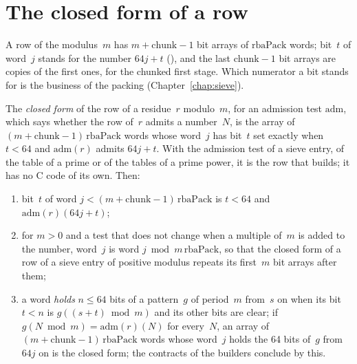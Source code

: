 \section{The closed form of a row}\label{sec:closedRow}

A row of the modulus~$m$ has $m + \mathrm{chunk} - 1$ bit arrays of $\mathrm{rbaPack}$ words;
bit~$t$ of word~$j$ stands for the number $64 j + t$ (), and the last
$\mathrm{chunk} - 1$ bit arrays are copies of the first ones, for the chunked first stage. Which
numerator a bit stands for is the business of the packing (Chapter~\ref{chap:sieve}).

\begin{lemma}\label{lem:closedRow}
  \leanok
  The \emph{closed form} of the row of a residue~$r$ modulo~$m$, for an admission test
  $\mathrm{adm}$, which says whether the row of~$r$ admits a number~$N$, is the array of
  $(m + \mathrm{chunk} - 1)\,\mathrm{rbaPack}$ words whose word~$j$ has bit~$t$ set exactly when
  $t < 64$ and $\mathrm{adm}(r)$ admits $64 j + t$. With the admission test of a sieve entry, of
  the table of a prime or of the tables of a prime power, it is the row that \ratpoints{} builds; it
  has no C code of its own. Then:
  \begin{enumerate}
    \item bit~$t$ of word $j < (m + \mathrm{chunk} - 1)\,\mathrm{rbaPack}$ is $t < 64$ and
      $\mathrm{adm}(r)(64 j + t)$;
    \item for $m > 0$ and a test that does not change when a multiple of~$m$ is added to the
      number, word~$j$ is word $j \bmod m\,\mathrm{rbaPack}$, so that the closed form of a row of a
      sieve entry of positive modulus repeats its first~$m$ bit arrays after them;
    \item a word \emph{holds} $n \le 64$ bits of a pattern~$g$ of period~$m$ from~$s$ on when its
      bit $t < n$ is $g((s + t) \bmod m)$ and its other bits are clear; if
      $g(N \bmod m) = \mathrm{adm}(r)(N)$ for every~$N$, an array of
      $(m + \mathrm{chunk} - 1)\,\mathrm{rbaPack}$ words whose word~$j$ holds the 64 bits of~$g$
      from~$64 j$ on is the closed form; the contracts of the builders conclude by this.
  \end{enumerate}
\end{lemma}

